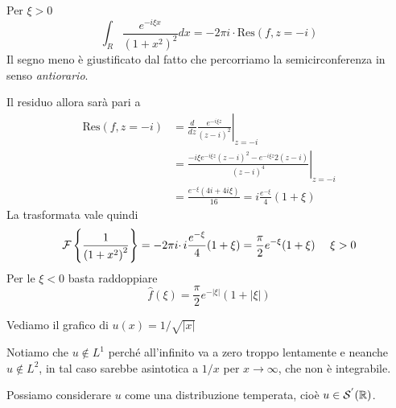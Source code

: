 Per $\xi  >0$
\begin{equation*}
\int _{R}\frac{e^{-i\xi x}}{\left( 1+x^{2}\right)^{2}} dx=-2\pi i\cdotp \mathrm{Res}( f,z=-i)
\end{equation*}
Il segno meno è giustificato dal fatto che percorriamo la semicirconferenza in senso \textit{antiorario}.

Il residuo allora sarà pari a
\begin{equation*}
\begin{aligned}
\mathrm{Res}( f,z=-i) & =\left. \frac{d}{dz}\frac{e^{-i\xi z}}{( z-i)^{2}}\right| _{z=-i}\\
 & =\left. \frac{-i\xi e^{-i\xi z}( z-i)^{2} -e^{-i\xi z} 2(z-i)}{( z-i)^{4}}\right| _{z=-i}\\
 & =\frac{e^{-\xi }( 4i+4i\xi )}{16} =i\frac{e^{-\xi }}{4} (1+\xi )
\end{aligned}
\end{equation*}
La trasformata vale quindi
\begin{equation*}
\mathcal{F} \left\{\frac{1}{\left( 1+x^{2}\right)^{2}}\right\} =-2\pi i\cdotp i\frac{e^{-\xi }}{4} (1+\xi )=\frac{\pi }{2} e^{-\xi }( 1+\xi ) \ \ \ \ \xi  >0
\end{equation*}
Per le $\xi < 0$ basta raddoppiare
\begin{equation*}
\hat{f}( \xi ) =\frac{\pi }{2} e^{-| \xi | } (1+| \xi | )
\end{equation*}
\Soluzione

Vediamo il grafico di $u(x)=1/\sqrt{|x|}$


Notiamo che $u\notin L^{1}$ perché all'infinito va a zero troppo lentamente e neanche $u\notin L^{2}$, in tal caso sarebbe asintotica a $1/x$ per $x\rightarrow \infty $, che non è integrabile.

Possiamo considerare $u$ come una distribuzione temperata, cioè $u\in \mathcal{S} ^{'}(\mathbb{R} )$.

